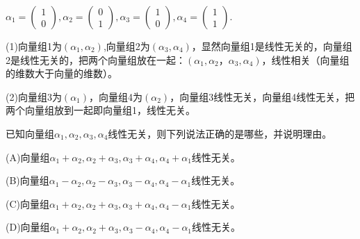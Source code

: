 \documentclass[a4paper]{report}
\begin{document}
\begin{jie}
$\alpha_1=
\begin{pmatrix}
1\\ 0
\end{pmatrix}
,\alpha_2=
\begin{pmatrix}
0\\ 1
\end{pmatrix},\alpha_3=
\begin{pmatrix}
1\\ 0
\end{pmatrix},\alpha_4=
\begin{pmatrix}
1\\ 1
\end{pmatrix}$.

(1)向量组1为$(\alpha_1,\alpha_2)$,向量组2为$(\alpha_3,\alpha_4)$，显然向量组1是线性无关的，向量组2是线性无关的，把两个向量组放在一起：$(\alpha_1,\alpha_2，\alpha_3,\alpha_4)$，线性相关（向量组的维数大于向量的维数）。

(2)向量组3为$(\alpha_1)$，向量组4为$(\alpha_2)$，向量组3线性无关，向量组4线性无关，把两个向量组放到一起即向量组1，线性无关。
\end{jie}

\EX 已知向量组$\alpha_1,\alpha_2,\alpha_3,\alpha_4$线性无关，则下列说法正确的是哪些，并说明理由。

(A)向量组$\alpha_1+\alpha_2,\alpha_2+\alpha_3,\alpha_3+\alpha_4,\alpha_4+\alpha_1$线性无关。

(B)向量组$\alpha_1-\alpha_2,\alpha_2-\alpha_3,\alpha_3-\alpha_4,\alpha_4-\alpha_1$线性无关。

(C)向量组$\alpha_1+\alpha_2,\alpha_2+\alpha_3,\alpha_3+\alpha_4,\alpha_4-\alpha_1$线性无关。

(D)向量组$\alpha_1+\alpha_2,\alpha_2+\alpha_3,\alpha_3-\alpha_4,\alpha_4-\alpha_1$线性无关。
\end{document}
